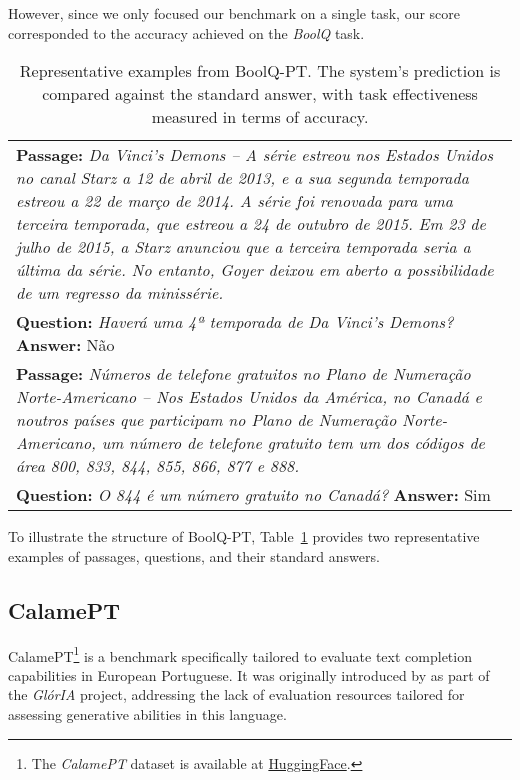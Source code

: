 However, since we only focused our benchmark on a single task, our score corresponded to the accuracy achieved on the \textit{BoolQ} task.

\begin{table}[H]
    \centering
    \begin{tabular}{|p{14cm}|}
        \hline
        \textbf{Passage:} \textit{Da Vinci's Demons -- A série estreou nos Estados Unidos no canal Starz a 12 de abril de 2013, e a sua segunda temporada estreou a 22 de março de 2014. A série foi renovada para uma terceira temporada, que estreou a 24 de outubro de 2015. Em 23 de julho de 2015, a Starz anunciou que a terceira temporada seria a última da série. No entanto, Goyer deixou em aberto a possibilidade de um regresso da minissérie.} \\
        \textbf{Question:} \textit{Haverá uma 4ª temporada de Da Vinci's Demons?
} \textbf{Answer:} Não \\
        \hline
        \textbf{Passage:} \textit{Números de telefone gratuitos no Plano de Numeração Norte-Americano -- Nos Estados Unidos da América, no Canadá e noutros países que participam no Plano de Numeração Norte-Americano, um número de telefone gratuito tem um dos códigos de área 800, 833, 844, 855, 866, 877 e 888.} \\
        \textbf{Question:} \textit{O 844 é um número gratuito no Canadá?} \textbf{Answer:} Sim \\
        \hline
    \end{tabular}
    \caption{Representative examples from BoolQ-PT. The system's prediction is compared against the standard answer, with task effectiveness measured in terms of accuracy.}
    \label{tab:boolq-examples}
\end{table}

To illustrate the structure of BoolQ-PT, Table~\ref{tab:boolq-examples} provides two representative examples of passages, questions, and their standard answers.


\subsection{CalamePT}\label{Section3.3.2}\label{subsec:dataset-calamept}
CalamePT\footnote{The \textit{CalamePT} dataset is available at \href{https://huggingface.co/datasets/NOVA-vision-language/calame-pt}{HuggingFace}.}
is a benchmark specifically tailored to evaluate text completion capabilities in European Portuguese. It was originally introduced by \citet{lopes2024gloriagenerativeopen} as part of the \emph{GlórIA} project, addressing the lack of evaluation resources tailored for assessing generative abilities in this language.

